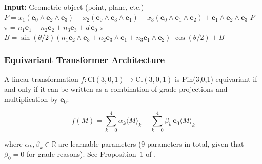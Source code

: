 \begin{algorithm}[H]
\caption{Embedding of Geometric Objects in GATr (PGA)}
\label{alg:embedding_gatr}
\begin{algorithmic}[1]
    \State \textbf{Input:} Geometric object (point, plane, etc.)
        \State $P = x_1 (\mathbf{e}_0 \wedge \mathbf{e}_2 \wedge \mathbf{e}_3) + x_2 (\mathbf{e}_0 \wedge \mathbf{e}_3 \wedge \mathbf{e}_1) + x_3 (\mathbf{e}_0 \wedge \mathbf{e}_1 \wedge \mathbf{e}_2) + \mathbf{e}_1 \wedge \mathbf{e}_2 \wedge \mathbf{e}_3$
        \State \Return $P$ 
    \EndFunction
        \State $\pi = n_1 \mathbf{e}_1 + n_2 \mathbf{e}_2 + n_3 \mathbf{e}_3 + d\, \mathbf{e}_0$
        \State \Return $\pi$ 
    \EndFunction
        \State $B = \sin(\theta/2) (n_1 \mathbf{e}_2 \wedge \mathbf{e}_3 + n_2 \mathbf{e}_3 \wedge \mathbf{e}_1 + n_3 \mathbf{e}_1 \wedge \mathbf{e}_2)$
        \State \Return $\cos(\theta/2) + B$ 
    \EndFunction
\end{algorithmic}
\end{algorithm}

\subsubsection{Equivariant Transformer Architecture}

\begin{definition}\label{def:capa_lineal_gatr}
A linear transformation $f: \text{Cl}(3,0,1) \to \text{Cl}(3,0,1)$ is Pin(3,0,1)-equivariant if and only if it can be written as a combination of grade projections and multiplication by $\mathbf{e}_0$:

\begin{equation}
    f(M) = \sum_{k=0}^4 \alpha_k \langle M \rangle_k + \sum_{k=0}^4 \beta_k\, \mathbf{e}_0 \langle M \rangle_k
    \label{eq:linear_equivariant_gatr}
\end{equation}

where $\alpha_k, \beta_k \in \mathbb{R}$ are learnable parameters (9 parameters in total, given that $\beta_0 = 0$ for grade reasons). See Proposition~1 of \citet{brehmer2023geometric}.
\end{definition}

